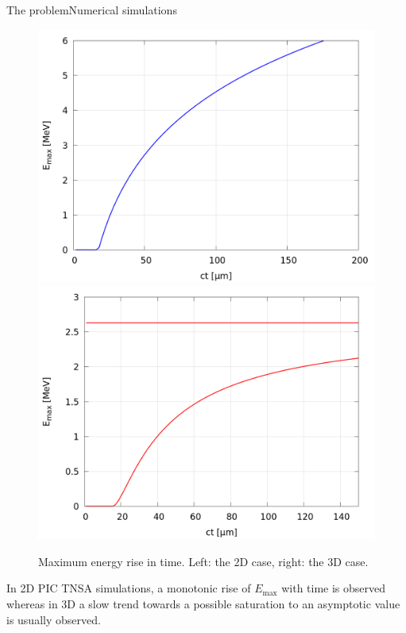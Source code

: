 \documentclass[final]{beamer}
\def\Emax{E_{\mathrm{max}}}
\begin{document}
\begin{frame}{The problem}{Numerical simulations}

\begin{figure}
\centering
\includegraphics[width=0.40 \textwidth]{figs/problem_2d.png} 
\hspace{1cm}
\includegraphics[width=0.40 \textwidth]{figs/problem_3d.png}
\caption{
  Maximum energy rise in time. Left: the 2D case, right: the 3D case.
}
\end{figure}


In 2D PIC TNSA simulations, a monotonic rise of $\Emax$ with time is observed whereas in 3D a slow trend towards a possible saturation to an asymptotic value is usually observed.

\end{frame}
\end{document}

